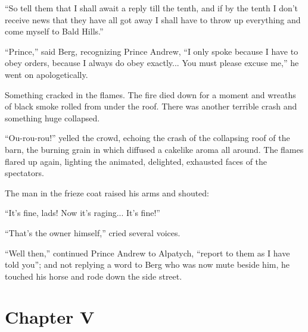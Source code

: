 ``So tell them that I shall await a reply till the tenth, and if
by the tenth I don't receive news that they have all got away I
shall have to throw up everything and come myself to Bald
Hills.''

``Prince,'' said Berg, recognizing Prince Andrew, ``I only spoke
because I have to obey orders, because I always do obey
exactly... You must please excuse me,'' he went on
apologetically.

Something cracked in the flames. The fire died down for a moment
and wreaths of black smoke rolled from under the roof. There was
another terrible crash and something huge collapsed.

``Ou-rou-rou!'' yelled the crowd, echoing the crash of the
collapsing roof of the barn, the burning grain in which diffused
a cakelike aroma all around. The flames flared up again, lighting
the animated, delighted, exhausted faces of the spectators.

The man in the frieze coat raised his arms and shouted:

``It's fine, lads! Now it's raging... It's fine!''

``That's the owner himself,'' cried several voices.

``Well then,'' continued Prince Andrew to Alpatych, ``report to
them as I have told you''; and not replying a word to Berg who
was now mute beside him, he touched his horse and rode down the
side street.


\chapter*{Chapter V} \ifaudio {}
\fi

